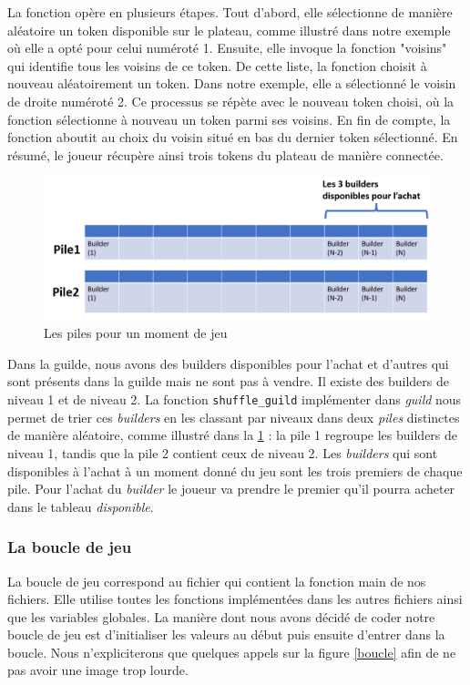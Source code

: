 \documentclass{article}
\begin{document}
\hspace{1.5em}La fonction opère en plusieurs étapes. Tout d'abord, elle sélectionne de manière aléatoire un token disponible sur le plateau, comme illustré dans notre exemple où elle a opté pour celui numéroté 1. Ensuite, elle invoque la fonction "voisins" qui identifie tous les voisins de ce token. De cette liste, la fonction choisit à nouveau aléatoirement un token. Dans notre exemple, elle a sélectionné le voisin de droite numéroté 2. Ce processus se répète avec le nouveau token choisi, où la fonction sélectionne à nouveau un token parmi ses voisins. En fin de compte, la fonction aboutit au choix du voisin situé en bas du dernier token sélectionné. En résumé, le joueur récupère ainsi trois tokens du plateau de manière connectée.

\vspace{2em}
 
\begin{figure}[ht]
    \centering
    \includegraphics[width=0.6\linewidth]{lespiles.PNG}
    \caption{Les piles pour un moment de jeu}
    \label{fig:lespiles}
\end{figure}
 Dans la guilde, nous avons des  builders disponibles pour l'achat et d'autres qui sont présents dans la guilde mais ne sont pas à vendre. Il existe des builders de niveau 1 et de niveau 2. La fonction \texttt{shuffle\_guild} implémenter dans \emph{guild} nous permet de trier ces \emph{builders} en les classant par niveaux dans deux \emph{piles} distinctes de manière aléatoire, comme illustré dans la \ref{fig:lespiles} : la pile 1 regroupe les builders de niveau 1, tandis que la pile 2 contient ceux de niveau 2. Les \emph{builders} qui sont disponibles à l'achat à un moment donné du jeu sont les trois premiers de chaque pile. Pour l'achat du \emph{builder} le joueur va prendre le premier qu'il pourra acheter dans le tableau \emph{disponible}. 

\newpage

\subsubsection{La boucle de jeu}

\hspace{1em} La boucle de jeu correspond au fichier qui contient la fonction main de nos fichiers. Elle utilise toutes les fonctions implémentées dans les autres fichiers ainsi que les variables globales. La manière dont nous avons décidé de coder notre boucle de jeu est d'initialiser les valeurs au début puis ensuite d'entrer dans la boucle. Nous n'expliciterons que quelques appels sur la figure \ref{boucle} afin de ne pas avoir une image trop lourde.
\end{document}
